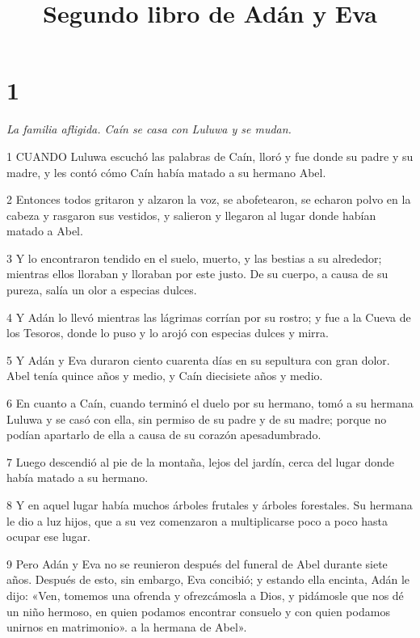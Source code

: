 

\title{Segundo libro de Adán y Eva}

\chapter{1}

\par \textit{La familia afligida. Caín se casa con Luluwa y se mudan.}

\par 1 CUANDO Luluwa escuchó las palabras de Caín, lloró y fue donde su padre y su madre, y les contó cómo Caín había matado a su hermano Abel.

\par 2 Entonces todos gritaron y alzaron la voz, se abofetearon, se echaron polvo en la cabeza y rasgaron sus vestidos, y salieron y llegaron al lugar donde habían matado a Abel.

\par 3 Y lo encontraron tendido en el suelo, muerto, y las bestias a su alrededor; mientras ellos lloraban y lloraban por este justo. De su cuerpo, a causa de su pureza, salía un olor a especias dulces.

\par 4 Y Adán lo llevó mientras las lágrimas corrían por su rostro; y fue a la Cueva de los Tesoros, donde lo puso y lo arojó con especias dulces y mirra.

\par 5 Y Adán y Eva duraron ciento cuarenta días en su sepultura con gran dolor. Abel tenía quince años y medio, y Caín diecisiete años y medio.

\par 6 En cuanto a Caín, cuando terminó el duelo por su hermano, tomó a su hermana Luluwa y se casó con ella, sin permiso de su padre y de su madre; porque no podían apartarlo de ella a causa de su corazón apesadumbrado.

\par 7 Luego descendió al pie de la montaña, lejos del jardín, cerca del lugar donde había matado a su hermano.

\par 8 Y en aquel lugar había muchos árboles frutales y árboles forestales. Su hermana le dio a luz hijos, que a su vez comenzaron a multiplicarse poco a poco hasta ocupar ese lugar.

\par 9 Pero Adán y Eva no se reunieron después del funeral de Abel durante siete años. Después de esto, sin embargo, Eva concibió; y estando ella encinta, Adán le dijo: «Ven, tomemos una ofrenda y ofrezcámosla a Dios, y pidámosle que nos dé un niño hermoso, en quien podamos encontrar consuelo y con quien podamos unirnos en matrimonio». a la hermana de Abel».

